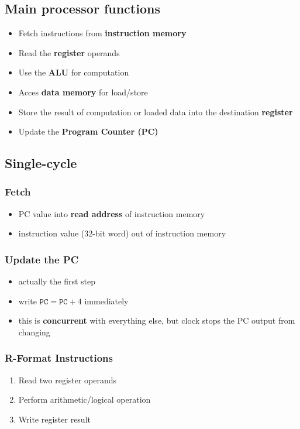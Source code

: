 \documentclass{article}
\begin{document}
\subsection{Main processor functions}
\begin{itemize}
	\item Fetch instructions from \textbf{instruction memory}
	\item Read the \textbf{register} operands
	\item Use the \textbf{ALU} for computation
	\item Acces \textbf{data memory} for load/store
	\item Store the result of computation or loaded data into the destination \textbf{register}
	\item Update the \textbf{Program Counter (PC)}
\end{itemize}
\subsection{Single-cycle}
\subsubsection{Fetch}
\begin{itemize}
	\item PC value into \textbf{read address} of instruction memory
	\item instruction value (32-bit word) out of instruction memory
\end{itemize}
\subsubsection{Update the PC}
\begin{itemize}
	\item actually the first step
	\item write $\texttt{PC}=\texttt{PC}+4$ immediately
	\item this is \textbf{concurrent} with everything else, but clock stops the PC output from changing 
\end{itemize}
\subsubsection{R-Format Instructions}
\begin{enumerate}
	\item Read two register operands
	\item Perform arithmetic/logical operation
	\item Write register result
\end{enumerate}
\end{document}
